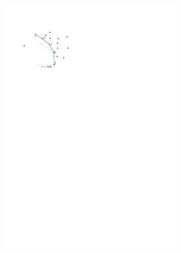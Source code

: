 \begin{figure}
  \centering
  \begin{subfigure}[b]{0.4\linewidth}
    \centering
    \includegraphics[page=1,width=\textwidth]{figs/movingarm.pdf}
    \caption{}
  \end{subfigure}%
  \qquad \qquad \quad
  \begin{subfigure}[b]{0.4\linewidth}
    \centering

\end{subfigure}
\end{figure}

